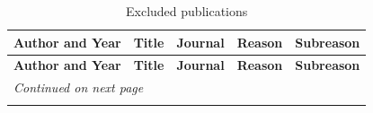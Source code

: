 \documentclass[11pt,final,fleqn]{article}
\theoremstyle{plain}
\begin{document}
\begin{appendices}
\begin{landscape}
\begin{longtable}{p{2cm}p{2cm}p{10cm}p{4cm}}
 \\
\hline 
\end{longtable}
\end{landscape}




\begin{landscape}
\scriptsize
\begin{longtable}{p{2cm}p{8cm}p{4cm}p{2cm}p{2cm}}
\caption{Excluded publications} 
\label{tbl:excluded-publications} \\
\hline
\textbf{Author and Year}&\textbf{Title}&\textbf{Journal}&\textbf{Reason}&\textbf{Subreason}& \\
\hline
\endfirsthead
\hline
\textbf{Author and Year}&\textbf{Title}&\textbf{Journal}&\textbf{Reason}&\textbf{Subreason}& \\
\hline
\endhead
\hline 
\multicolumn{7}{l}{\emph{Continued on next page}} \\
\endfoot
\endlastfoot

 \\
\hline 
\end{longtable}
\end{landscape}









\end{appendices}
\end{document}
